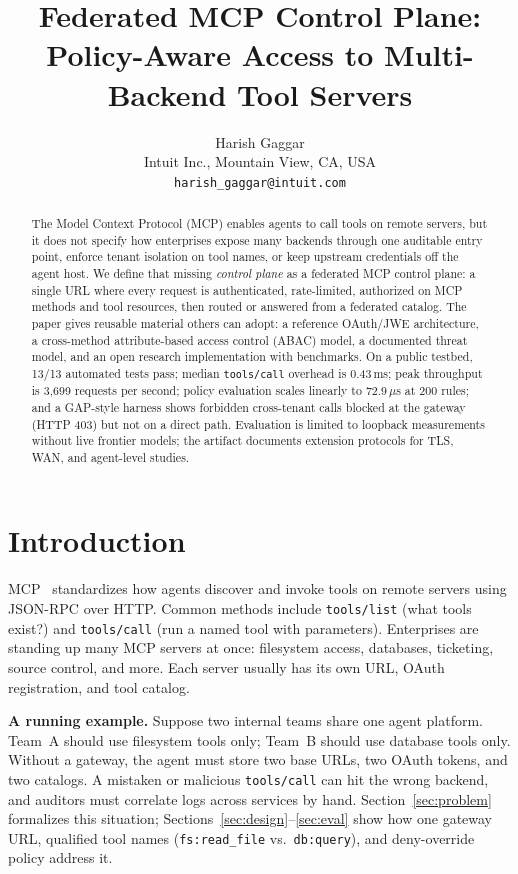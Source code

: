 \documentclass[11pt]{article}
\title{Federated MCP Control Plane: Policy-Aware Access to Multi-Backend Tool Servers}
\author{Harish Gaggar\\
  Intuit Inc., Mountain View, CA, USA\\
  \texttt{harish\_gaggar@intuit.com}}
\date{}
\newcommand{\code}[1]{\texttt{#1}}
\newcommand{\mcpcp}{federated MCP control plane}
\begin{document}
\maketitle

\begin{abstract}
\noindent
The Model Context Protocol (MCP) enables agents to call tools on remote servers, but it does not specify how enterprises expose many backends through one auditable entry point, enforce tenant isolation on tool names, or keep upstream credentials off the agent host.
We define that missing \emph{control plane} as a \mcpcp{}: a single URL where every request is authenticated, rate-limited, authorized on MCP methods and tool resources, then routed or answered from a federated catalog.
The paper gives reusable material others can adopt: a reference OAuth/JWE architecture, a cross-method attribute-based access control (ABAC) model, a documented threat model, and an open research implementation with benchmarks.
On a public testbed, 13/13 automated tests pass; median \code{tools/call} overhead is 0.43\,ms; peak throughput is 3{,}699 requests per second; policy evaluation scales linearly to 72.9\,$\mu$s at 200 rules; and a GAP-style harness shows forbidden cross-tenant calls blocked at the gateway (HTTP 403) but not on a direct path.
Evaluation is limited to loopback measurements without live frontier models; the artifact documents extension protocols for TLS, WAN, and agent-level studies.
\end{abstract}

\section{Introduction}
\label{sec:intro}

MCP~\cite{anthropic2024mcp} standardizes how agents discover and invoke tools on remote servers using JSON-RPC over HTTP.
Common methods include \code{tools/list} (what tools exist?) and \code{tools/call} (run a named tool with parameters).
Enterprises are standing up many MCP servers at once: filesystem access, databases, ticketing, source control, and more.
Each server usually has its own URL, OAuth registration, and tool catalog.

\textbf{A running example.}
Suppose two internal teams share one agent platform.
Team~A should use filesystem tools only; Team~B should use database tools only.
Without a gateway, the agent must store two base URLs, two OAuth tokens, and two catalogs.
A mistaken or malicious \code{tools/call} can hit the wrong backend, and auditors must correlate logs across services by hand.
Section~\ref{sec:problem} formalizes this situation; Sections~\ref{sec:design}--\ref{sec:eval} show how one gateway URL, qualified tool names (\code{fs:read\_file} vs.\ \code{db:query}), and deny-override policy address it.
\end{document}
